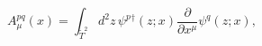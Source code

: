 \begin{equation}\label{t2inverse}
A^{pq}_\mu(x)=\int_{\tilde T^2} d^2z\,
\psi^p{}^\dagger(z;x)\frac{\partial}{\partial x^\mu}
\psi^q(z;x),
\end{equation}

